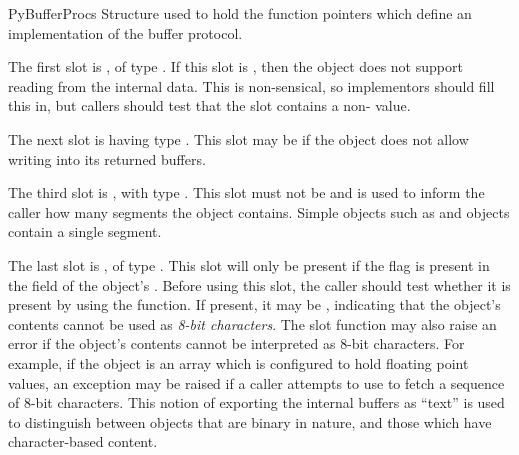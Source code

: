 
\begin{ctypedesc}{PyBufferProcs}
  Structure used to hold the function pointers which define an
  implementation of the buffer protocol.

  The first slot is , of type
  .  If this slot is \NULL, then the object
  does not support reading from the internal data.  This is
  non-sensical, so implementors should fill this in, but callers
  should test that the slot contains a non-\NULL{} value.

  The next slot is  having type
  .  This slot may be \NULL{} if the object
  does not allow writing into its returned buffers.

  The third slot is , with type
  .  This slot must not be \NULL{} and is used
  to inform the caller how many segments the object contains.  Simple
  objects such as  and 
  objects contain a single segment.

  The last slot is , of type
  .  This slot will only be present if the
   flag is present in the
   field of the object's .
  Before using this slot, the caller should test whether it is present
  by using the
  function.  If present, it may be \NULL, indicating that the object's
  contents cannot be used as \emph{8-bit characters}.
  The slot function may also raise an error if the object's contents
  cannot be interpreted as 8-bit characters.  For example, if the
  object is an array which is configured to hold floating point
  values, an exception may be raised if a caller attempts to use
   to fetch a sequence of 8-bit characters.
  This notion of exporting the internal buffers as ``text'' is used to
  distinguish between objects that are binary in nature, and those
  which have character-based content.

\end{ctypedesc}

